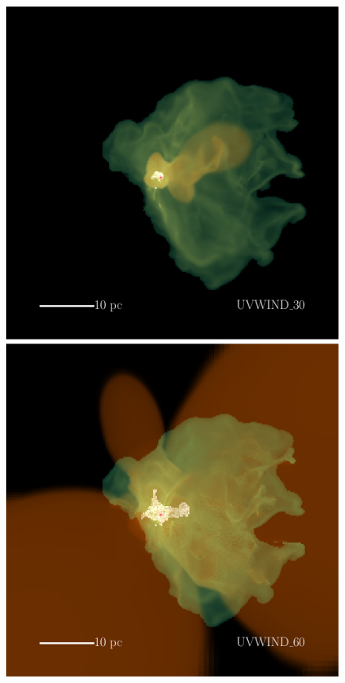 \documentclass[a4paper,fleqn,usenatbib]{mnras}
\begin{document}
\begin{figure}
	\includegraphics[width=1\columnwidth]{../plots/vis/multiray/multirayTime_coolemission_ionemission_xrayemission2__windset_30Msun0p2Myr_zoom0p5__xwindonly.pdf} \includegraphics[width=1\columnwidth]{../plots/vis/multiray/multirayTime_coolemission_ionemission_xrayemission2__windset_60Msun0p2Myr_zoom0p5__xwindonly.pdf}

\end{figure}
\end{document}
